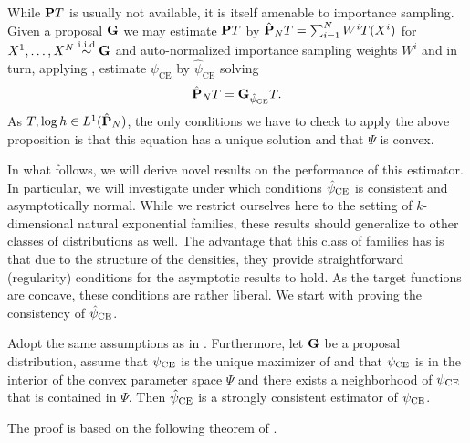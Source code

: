 While $\P T$ is usually not available, it is itself amenable to importance sampling. Given a proposal $\G$ we may estimate $\P T$ by $\hat\P_N T = \sum_{i = 1}^{N} W^{i} T(X^{i})$ for $X^{1}, \dots, X^{N} \iid \G$ and auto-normalized importance sampling weights $W^{i}$ and in turn, applying , estimate $\psi_{\text{CE}}$ by $\hat \psi_{\text{CE}}$ solving
$$
\hat \P_N T = \G_{\hpce} T.
$$
As $T, \log h \in L^{1}(\hat \P_{N})$, the only conditions we have to check to apply the above proposition is that this equation has a unique solution and that $\Psi$ is convex. 

In what follows, we will derive novel results on the performance of this estimator. In particular, we will investigate under which conditions $\hpce$ is consistent and asymptotically normal. While we restrict ourselves here to the setting of $k$-dimensional natural exponential families, these results should generalize to other classes of distributions as well. The advantage that this class of families has is that due to the structure of the densities, they provide straightforward (regularity) conditions for the asymptotic results to hold. As the target functions are concave, these conditions are rather liberal. We start with proving the consistency of $\hpce$. 

\begin{proposition}
    \label{prop:cem-consistent}
    Adopt the same assumptions as in . Furthermore, let $\G$ be a proposal distribution, assume that $\pce$ is the unique maximizer of  and that $\pce$ is in the interior of the convex parameter space $\Psi$ and there exists a neighborhood of $\pce$ that is contained in $\Psi$. Then $\hpce$ is a strongly consistent estimator of $\pce$.
\end{proposition}

The proof is based on the following theorem of \citeauthor{Haberman1989Concavity}.

